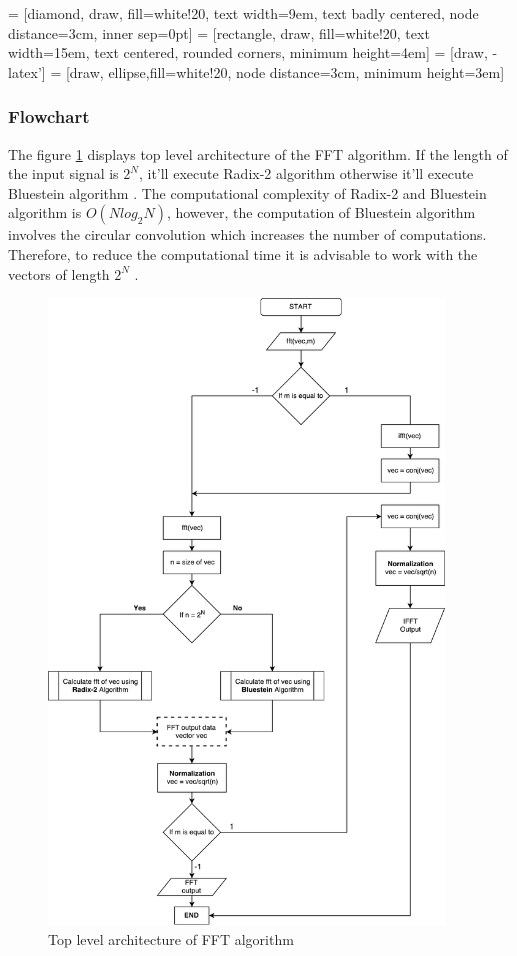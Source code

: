 \newpage
 = [diamond, draw, fill=white!20,
text width=9em, text badly centered, node distance=3cm, inner sep=0pt]
 = [rectangle, draw, fill=white!20,
text width=15em, text centered, rounded corners, minimum height=4em]
 = [draw, -latex']
 = [draw, ellipse,fill=white!20, node distance=3cm,
minimum height=3em]

\subsubsection{Flowchart}
The figure \ref{FFT_flowchart} displays top level architecture of the FFT algorithm.  If the length of the input signal is $2^N$, it'll execute Radix-2 algorithm otherwise it'll execute Bluestein algorithm \cite{Rao2010a}. The computational complexity of Radix-2 and Bluestein algorithm is $O(Nlog_{2}N)$, however, the computation of Bluestein algorithm involves the circular convolution which increases the number of computations. Therefore, to reduce the computational time it is advisable to work with the vectors of length $2^N$ \cite{Chu2000}.


\begin{figure}[h]
	\centering
	\includegraphics[width=10.5cm]{./algorithms/fft/figures/FFT_flowchart.pdf}
	\caption{Top level architecture of FFT algorithm}\label{FFT_flowchart}
\end{figure}



